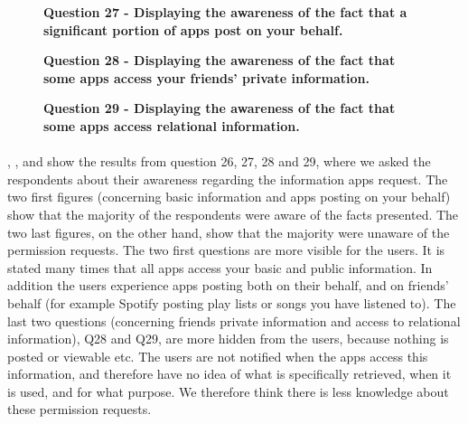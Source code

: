 \begin{figure}[h!]
\centering
{}
\caption[Question 27 - Displaying the awareness of the fact that a significant portion of apps post on your behalf]{\textbf{Question 27 - Displaying the awareness of the fact that a significant portion of apps post on your behalf.}} 
\label{fig:appspostonyourbehalf}
\end{figure}

\begin{figure}[h!]
\centering
{}
\caption[Question 28 - Displaying the awareness of the fact that some apps access your friends' private information]{\textbf{Question 28 - Displaying the awareness of the fact that some apps access your friends' private information.}} 
\label{fig:appsaccesstofriendsinfo}
\end{figure}

\begin{figure}[h!]
\centering
{}
\caption[Question 29 - Displaying the awareness of the fact that some apps access relational information]{\textbf{Question 29 - Displaying the awareness of the fact that some apps access relational information.}} 
\label{fig:appsaccessrelationalinfo}
\end{figure}

\paragraph{}
, ,  and  show the results from question 26, 27, 28 and 29, where we asked the respondents about their awareness regarding the information apps request. The two first figures (concerning basic information and apps posting on your behalf) show that the majority of the respondents were aware of the facts presented. The two last figures, on the other hand, show that the majority were unaware of the permission requests. The two first questions are more visible for the users. It is stated many times that all apps access your basic and public information. In addition the users experience apps posting both on their behalf, and on friends' behalf (for example Spotify posting play lists or songs you have listened to). The last two questions (concerning friends private information and access to relational information), Q28 and Q29,  are more hidden from the users, because nothing is posted or viewable etc. The users are not notified when the apps access this information, and therefore have no idea of what is specifically retrieved, when it is used, and for what purpose. We therefore think there is less knowledge about these permission requests. 

